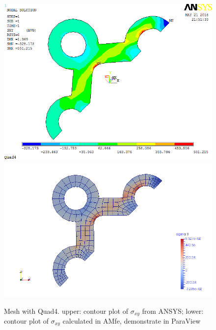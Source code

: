 \begin{figure}[htbp]
	\begin{center}
		\includegraphics[width=13cm,clip]{Quad4_Sxy.png} 		
		\includegraphics[width=13cm,clip]{Quad4_Sxy_P.png} 		
		\caption{Mesh with Quad4. upper: contour plot of $\sigma_{xy}$ from ANSYS; lower: contour plot of $\sigma_{xy}$ calculated in AMfe, demonstrate in ParaView} \label{fig: Quad4_Sxy}
	\end{center}
\end{figure}
\clearpage 

